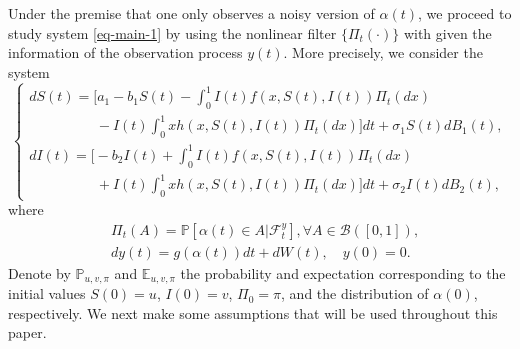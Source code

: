 \documentclass[12pt]{amsart}
\theoremstyle{remark}
\numberwithin{equation}{section}
\newcommand{\F}{\mathcal{F}}
\newcommand{\E}{\mathbb{E}}
\newcommand{\PP}{\mathbb{P}}
\numberwithin{equation}{section}
\newcommand{\PPi}{\PP_{u,v,\pi}}
\newcommand{\Ei}{\E_{u,v,\pi}}
\newcommand{\1}{\boldsymbol{1}}
\begin{document}
Under the premise that
one only observes a noisy version of
$\alpha(t)$,
we proceed to study  system \eqref{eq-main-1} by using
the nonlinear filter $\{\Pi_t(\cdot)\}$
with given the information of the observation process $y(t)$. More precisely, we consider the system
\begin{equation}\label{eq-main}
\begin{cases}
dS(t)=\Big[a_1-b_1S(t)-\int_0^1I(t)f(x,S(t),I(t))\Pi_t(dx)
\\
\hspace{2cm}
-I(t)\int_0^1xh(x,S(t),I(t))\Pi_t(dx)\Big]dt + \sigma_1 S(t) dB_1(t),\\[1ex]
dI(t)=\Big[-b_2I(t) + \int_0^1I(t)f(x,S(t),I(t))\Pi_t(dx)
\\
\hspace{2cm}
+I(t)\int_0^1xh(x,S(t),I(t))\Pi_t(dx)\Big]dt + \sigma_2I(t) dB_2(t),
\end{cases}
\end{equation}
where
$$
\begin{aligned}
&\Pi_t(A)=\PP[\alpha(t)\in A|\F_t^y],\forall A\in \mathcal B([0,1]),\\
&dy(t)=g(\alpha(t))dt+dW(t), \quad y(0)=0.
\end{aligned}
$$
Denote by $\PPi$ and $\Ei$ the probability and expectation corresponding to the initial values $S(0)=u$, $I(0)=v$,  $\Pi_0=\pi$, and the distribution of $\alpha(0)$, respectively.
We next make some assumptions that will be used throughout this paper.

\end{document}
